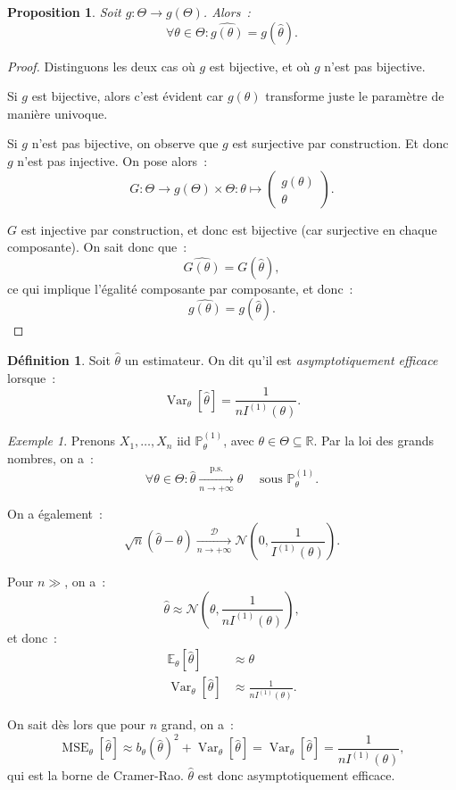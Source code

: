 \documentclass{report}
\DeclareMathOperator{\Var}{Var}
\DeclareMathOperator{\MSE}{MSE}
\renewcommand{\P}{\mathbb P}
\newcommand{\E}{\mathbb E}
\newcommand{\pinfty}{{+\infty}}
\newcommand{\cvgd}{\xrightarrow[n \to \pinfty]{\mathcal D}}
\newcommand{\ps}{{\text{p.s.}}}
\newcommand{\cvgps}{\xrightarrow[n \to \pinfty]\ps}
\newcommand{\R}{\mathbb R}
\newtheorem{prp}[thm]{Proposition}
\theoremstyle{definition}
\newtheorem{déf}[thm]{Définition}
\theoremstyle{remark}
\newtheorem{ex}{Exemple}[chapter]
\begin{document}
			\begin{prp} Soit $g : \Theta \to g(\Theta)$. Alors~:
			\[\forall \theta \in \Theta : \widehat {g(\theta)} = g(\widehat \theta).\]
			\end{prp}

			\begin{proof} Distinguons les deux cas où $g$ est bijective, et où $g$ n'est pas bijective.

			Si $g$ est bijective, alors c'est évident car $g(\theta)$ transforme juste le paramètre de manière univoque.

			Si $g$ n'est pas bijective, on observe que $g$ est surjective par construction. Et donc $g$ n'est pas injective. On pose alors~:
			\[G : \Theta \to g(\Theta) \times \Theta : \theta \mapsto \begin{pmatrix}g(\theta) \\ \theta\end{pmatrix}.\]

			$G$ est injective par construction, et donc est bijective (car surjective en chaque composante). On sait donc que~:
			\[\widehat {G(\theta)} = G(\widehat \theta),\]
			ce qui implique l'égalité composante par composante, et donc~:
			\[\widehat {g(\theta)} = g(\widehat \theta).\]
			\end{proof}

			\begin{déf} Soit $\widehat \theta$ un estimateur. On dit qu'il est \textit{asymptotiquement efficace} lorsque~:
			\[\Var_\theta[\widehat \theta] = \frac 1{nI^{(1)}(\theta)}.\]
			\end{déf}

			\begin{ex} Prenons $X_1, \ldots, X_n$ iid $\P_\theta^{(1)}$, avec $\theta \in \Theta \subseteq \R$. Par la loi des grands nombres, on a~:
			\[\forall \theta \in \Theta : \widehat \theta \cvgps \theta \quad \text{ sous } \P_\theta^{(1)}.\]

			On a également~:
			\[\sqrt n(\widehat \theta - \theta) \cvgd \mathcal N\left(0, \frac 1{I^{(1)}(\theta)}\right).\]

			Pour $n \gg$, on a~:
			\[\widehat \theta \approx \mathcal N\left(\theta, \frac 1{nI^{(1)}(\theta)}\right),\]
			et donc~:
			\begin{align*}
				\E_\theta[\widehat \theta] &\approx \theta \\
				\Var_\theta[\widehat \theta] &\approx \frac 1{nI^{(1)}(\theta)}.
			\end{align*}

			On sait dès lors que pour $n$ grand, on a~:
			\[\MSE_\theta[\widehat \theta] \approx b_\theta(\widehat \theta)^2 + \Var_\theta[\widehat \theta] = \Var_\theta[\widehat \theta]
				= \frac 1{nI^{(1)}(\theta)},\]
			qui est la borne de Cramer-Rao. $\widehat \theta$ est donc asymptotiquement efficace.
			\end{ex}
\end{document}
